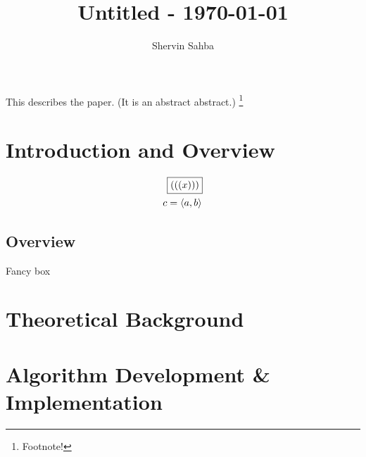 \documentclass{shervin} %
\begin{document}
\title{Untitled - \today}

\author{Shervin Sahba\authormark{}}
\address{\authormark{}Department of Physics, University of Washington, Seattle, USA.}

\begin{abstract*}
This describes the paper. (It is an abstract abstract.) \footnote{Footnote!}
\end{abstract*}


\section{Introduction and Overview} \label{sec: Introduction}

\begin{tcolorbox}[title=Cool Box, fonttitle=\bfseries, titlebox=visible, sidebyside, enhanced, frame style={left color=red!75!black,right color=blue!75!black}]
\begin{align}
&\boxed{(((x)))} \\
c&= \langle a, b \rangle
\end{align}

\tcblower
\lipsum[1]
\end{tcolorbox}


\subsection{Overview} \label{sec: Overview}

\begin{mybox}{Fancy box}
\lipsum[2]
\end{mybox}

\bigskip
\section{Theoretical Background} \label{sec:Background}

\bigskip
\section{Algorithm Development \& Implementation} \label{sec:Methods}
\end{document}
